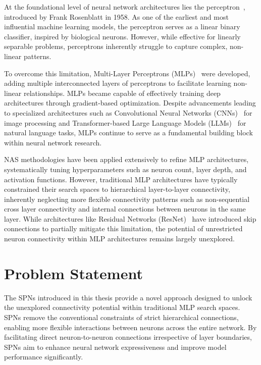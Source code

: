 At the foundational level of neural network architectures lies the perceptron~\cite{rosenblatt1958perceptron}, introduced by Frank Rosenblatt in 1958. As one of the earliest and most influential machine learning models, the perceptron serves as a linear binary classifier, inspired by biological neurons. However, while effective for linearly separable problems, perceptrons inherently struggle to capture complex, non-linear patterns.

To overcome this limitation, Multi-Layer Perceptrons (MLPs)~\cite{rumelhart1986learning} were developed, adding multiple interconnected layers of perceptrons to facilitate learning non-linear relationships. MLPs became capable of effectively training deep architectures through gradient-based optimization. Despite advancements leading to specialized architectures such as Convolutional Neural Networks (CNNs)~\cite{krizhevsky2012imagenet} for image processing and Transformer-based Large Language Models (LLMs)~\cite{vaswani2017attention} for natural language tasks, MLPs continue to serve as a fundamental building block within neural network research.

NAS methodologies have been applied extensively to refine MLP architectures, systematically tuning hyperparameters such as neuron count, layer depth, and activation functions. However, traditional MLP architectures have typically constrained their search spaces to hierarchical layer-to-layer connectivity, inherently neglecting more flexible connectivity patterns such as non-sequential cross layer connectivity and internal connections between neurons in the same layer. While architectures like Residual Networks (ResNet)~\cite{he2016deep} have introduced skip connections to partially mitigate this limitation, the potential of unrestricted neuron connectivity within MLP architectures remains largely unexplored.

\section{Problem Statement}

The SPNs introduced in this thesis provide a novel approach designed to unlock the unexplored connectivity potential within traditional MLP search spaces. SPNs remove the conventional constraints of strict hierarchical connections, enabling more flexible interactions between neurons across the entire network. By facilitating direct neuron-to-neuron connections irrespective of layer boundaries, SPNs aim to enhance neural network expressiveness and improve model performance significantly.

